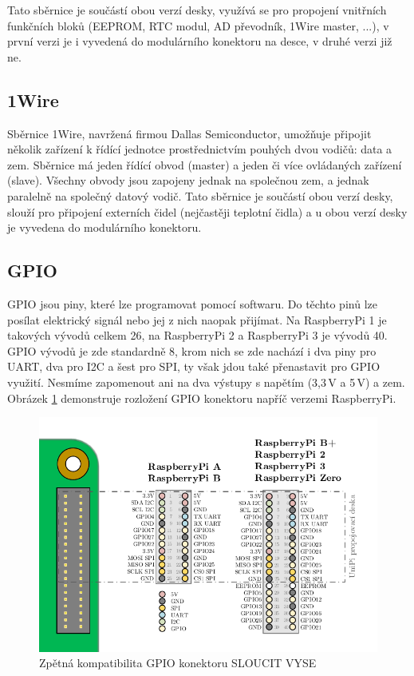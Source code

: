 Tato sběrnice je součástí obou verzí desky, využívá se pro propojení vnitřních funkčních bloků (EEPROM, RTC modul, AD převodník, 1Wire master, ...), v první verzi je i vyvedená do modulárního konektoru na desce, v druhé verzi již ne.

\subsection{1Wire}
Sběrnice 1Wire, navržená firmou Dallas Semiconductor, umožňuje připojit několik zařízení k řídící jednotce prostřednictvím pouhých dvou vodičů: data a zem. Sběrnice má jeden řídící obvod (master) a jeden či více ovládaných zařízení (slave). Všechny obvody jsou zapojeny jednak na společnou zem, a jednak paralelně na společný datový vodič. Tato sběrnice je součástí obou verzí desky, slouží pro připojení externích čidel (nejčastěji teplotní čidla) a u obou verzí desky je vyvedena do modulárního konektoru.

\subsection{GPIO}
\label{KapGPIO}
GPIO jsou piny, které lze programovat pomocí softwaru. Do těchto pinů lze posílat elektrický signál nebo jej z nich naopak přijímat. Na RaspberryPi 1 je takových vývodů celkem 26, na RaspberryPi 2 a RaspberryPi 3 je vývodů 40. GPIO vývodů je zde standardně 8, krom nich se zde nachází i dva piny pro UART, dva pro I2C a šest pro SPI, ty však jdou také přenastavit pro GPIO využití. Nesmíme zapomenout ani na dva výstupy s napětím (3,3\,V a 5\,V) a zem.
Obrázek \ref{ObrazekGPIO} demonstruje rozložení GPIO konektoru napříč verzemi RaspberryPi.

\begin{figure}[!h]
  \begin{center}
    \includegraphics[scale=0.6]{obrazky/unipi_gpio}
  \end{center}
  \caption{Zpětná kompatibilita GPIO konektoru \cite{SberniceGPIO} \colorbox[rgb]{1,0,0}{SLOUCIT VYSE}}
	\label{ObrazekGPIO}
\end{figure}

